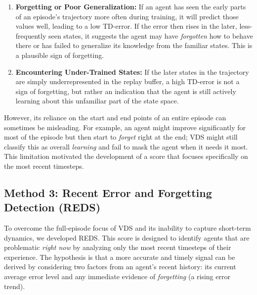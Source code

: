 \begin{enumerate}
    \item \textbf{Forgetting or Poor Generalization:} If an agent has seen the early parts of an episode's trajectory more often during training, it will predict those values well, leading to a low TD-error. If the error then rises in the later, less-frequently seen states, it suggests the agent may have \textit{forgotten} how to behave there or has failed to generalize its knowledge from the familiar states. This is a plausible sign of forgetting.
    
    \item \textbf{Encountering Under-Trained States:} If the later states in the trajectory are simply underrepresented in the replay buffer, a high TD-error is not a sign of forgetting, but rather an indication that the agent is still actively learning about this unfamiliar part of the state space.
\end{enumerate}
However, its reliance on the start and end points of an entire episode can sometimes be misleading. For example, an agent might improve significantly for most of the episode but then start to \textit{forget} right at the end; VDS might still classify this as overall \textit{learning} and fail to mask the agent when it needs it most. This limitation motivated the development of a score that focuses specifically on the most recent timesteps.


\subsection{Method 3: Recent Error and Forgetting Detection (REDS)}
\label{subsec:reds_method}

To overcome the full-episode focus of VDS and its inability to capture short-term dynamics, we developed REDS. This score is designed to identify agents that are problematic \textit{right now} by analyzing only the most recent timesteps of their experience. The hypothesis is that a more accurate and timely signal can be derived by considering two factors from an agent's recent history: its current average error level and any immediate evidence of \textit{forgetting} (a rising error trend).


